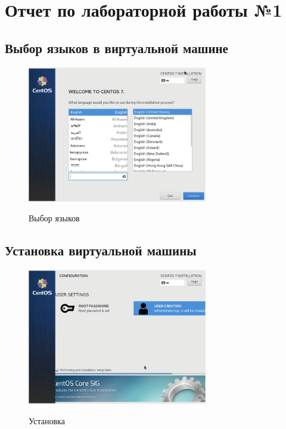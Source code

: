 \section{Отчет по лабораторной работы
№1}\label{ux43eux442ux447ux435ux442-ux43fux43e-ux43bux430ux431ux43eux440ux430ux442ux43eux440ux43dux43eux439-ux440ux430ux431ux43eux442ux44b-1}

\subsection{Выбор языков в виртуальной
машине}\label{ux432ux44bux431ux43eux440-ux44fux437ux44bux43aux43eux432-ux432-ux432ux438ux440ux442ux443ux430ux43bux44cux43dux43eux439-ux43cux430ux448ux438ux43dux435}

\begin{figure}
\label{fig:001}
\centering
\includegraphics[width=0.7\textwidth,height=\textheight]{image/1.png}
\caption{Выбор языков}\label{fig:001}
\end{figure}

\subsection{Установка виртуальной
машины}\label{ux443ux441ux442ux430ux43dux43eux432ux43aux430-ux432ux438ux440ux442ux443ux430ux43bux44cux43dux43eux439-ux43cux430ux448ux438ux43dux44b}

\begin{figure}
\label{fig:002}
\centering
\includegraphics[width=0.7\textwidth,height=\textheight]{image/2.png}
\caption{Установка}\label{fig:002}
\end{figure}

